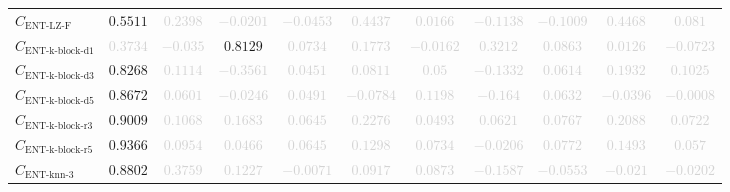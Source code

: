 \documentclass{standalone}
\newcommand{\entlempelzivflatname}{\text{ENT-LZ-F}}
\newcommand{\entlempelzivflat}{C_{\entlempelzivflatname}}
\newcommand{\entkblockdonename}{\text{ENT-k-block-d1}}
\newcommand{\entkblockdone}{C_{\entkblockdonename}}
\newcommand{\entkblockdthreename}{\text{ENT-k-block-d3}}
\newcommand{\entkblockdthree}{C_{\entkblockdthreename}}
\newcommand{\entkblockdfivename}{\text{ENT-k-block-d5}}
\newcommand{\entkblockdfive}{C_{\entkblockdfivename}}
\newcommand{\entkblockrthreename}{\text{ENT-k-block-r3}}
\newcommand{\entkblockrthree}{C_{\entkblockrthreename}}
\newcommand{\entkblockrfivename}{\text{ENT-k-block-r5}}
\newcommand{\entkblockrfive}{C_{\entkblockrfivename}}
\newcommand{\entknnthreename}{\text{ENT-knn-3}}
\newcommand{\entknnthree}{C_{\entknnthreename}}
\begin{document}
\begin{tabular}{lcccccccccc}
$\entlempelzivflat$ & $0.5511$ & \textcolor{lightgray}{$0.2398$} & \textcolor{lightgray}{$-0.0201$} & \textcolor{lightgray}{$-0.0453$} & \textcolor{lightgray}{$0.4437$} & \textcolor{lightgray}{$0.0166$} & \textcolor{lightgray}{$-0.1138$} & \textcolor{lightgray}{$-0.1009$} & \textcolor{lightgray}{$0.4468$} & \textcolor{lightgray}{$0.081$} \\ 
$\entkblockdone$ & \textcolor{lightgray}{$0.3734$} & \textcolor{lightgray}{$-0.035$} & $0.8129$ & \textcolor{lightgray}{$0.0734$} & \textcolor{lightgray}{$0.1773$} & \textcolor{lightgray}{$-0.0162$} & \textcolor{lightgray}{$0.3212$} & \textcolor{lightgray}{$0.0863$} & \textcolor{lightgray}{$0.0126$} & \textcolor{lightgray}{$-0.0723$} \\ 
$\entkblockdthree$ & $0.8268$ & \textcolor{lightgray}{$0.1114$} & \textcolor{lightgray}{$-0.3561$} & \textcolor{lightgray}{$0.0451$} & \textcolor{lightgray}{$0.0811$} & \textcolor{lightgray}{$0.05$} & \textcolor{lightgray}{$-0.1332$} & \textcolor{lightgray}{$0.0614$} & \textcolor{lightgray}{$0.1932$} & \textcolor{lightgray}{$0.1025$} \\ 
$\entkblockdfive$ & $0.8672$ & \textcolor{lightgray}{$0.0601$} & \textcolor{lightgray}{$-0.0246$} & \textcolor{lightgray}{$0.0491$} & \textcolor{lightgray}{$-0.0784$} & \textcolor{lightgray}{$0.1198$} & \textcolor{lightgray}{$-0.164$} & \textcolor{lightgray}{$0.0632$} & \textcolor{lightgray}{$-0.0396$} & \textcolor{lightgray}{$-0.0008$} \\ 
$\entkblockrthree$ & $0.9009$ & \textcolor{lightgray}{$0.1068$} & \textcolor{lightgray}{$0.1683$} & \textcolor{lightgray}{$0.0645$} & \textcolor{lightgray}{$0.2276$} & \textcolor{lightgray}{$0.0493$} & \textcolor{lightgray}{$0.0621$} & \textcolor{lightgray}{$0.0767$} & \textcolor{lightgray}{$0.2088$} & \textcolor{lightgray}{$0.0722$} \\ 
$\entkblockrfive$ & $0.9366$ & \textcolor{lightgray}{$0.0954$} & \textcolor{lightgray}{$0.0466$} & \textcolor{lightgray}{$0.0645$} & \textcolor{lightgray}{$0.1298$} & \textcolor{lightgray}{$0.0734$} & \textcolor{lightgray}{$-0.0206$} & \textcolor{lightgray}{$0.0772$} & \textcolor{lightgray}{$0.1493$} & \textcolor{lightgray}{$0.057$} \\ 
$\entknnthree$ & $0.8802$ & \textcolor{lightgray}{$0.3759$} & \textcolor{lightgray}{$0.1227$} & \textcolor{lightgray}{$-0.0071$} & \textcolor{lightgray}{$0.0917$} & \textcolor{lightgray}{$0.0873$} & \textcolor{lightgray}{$-0.1587$} & \textcolor{lightgray}{$-0.0553$} & \textcolor{lightgray}{$-0.021$} & \textcolor{lightgray}{$-0.0202$} \\ 

\end{tabular}
\end{document}

